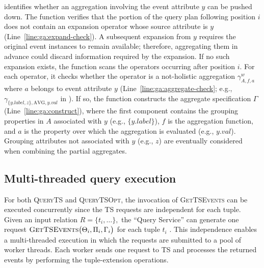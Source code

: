  identifies whether an aggregation involving the event attribute $y$ can be pushed down.
The function verifies that the portion of the query plan following position $i$ does not contain an expansion operator whose source attribute is $y$ (Line~\ref{line:ga:expand-check}).
A subsequent expansion from $y$ requires the original event instances to remain available; therefore, aggregating them in advance could discard information required by the expansion.
If no such expansion exists, the function scans the operators occurring after position $i$.
For each operator, it checks whether the operator is a not-holistic aggregation $\gamma^w_{A,f,a}$ where $a$ belongs to event attribute $y$ (Line~\ref{line:ga:aggregate-check}; e.g., $\gamma_{\{y.label,z\},\mathrm{AVG},y.val}$ in ).
If so, the function constructs the aggregate specification $\Gamma$ (Line~\ref{line:ga:construct}), where the first component contains the grouping properties in $A$ associated with $y$ (e.g., $\{y.label\}$), $f$ is the aggregation function, and $a$ is the property over which the aggregation is evaluated (e.g., $y.val$).
Grouping attributes not associated with $y$ (e.g., $z$) are eventually considered when combining the partial aggregates.

\subsection{Multi-threaded query execution}
\label{subsec:query-parallel-execution}

For both \textsc{QueryTS} and \textsc{QueryTSOpt}, the invocation of \textsc{GetTSEvents} can be executed concurrently since the TS requests are independent for each tuple.
Given an input relation
$
    R=\{t_i,\ldots\},
$
the ``Query Service'' can generate one request 
$
    \textsc{GetTSEvents}
    \bigl(
        \Theta_i,
        \Pi_i,
        \Gamma_i
    \bigr)$
for each tuple $t_i$
.
This independence enables a multi-threaded execution in which the requests are submitted to a pool of worker threads.
Each worker sends one request to TS and processes the returned events by performing the tuple-extension operations.

